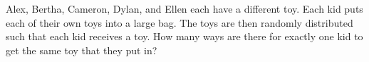 Alex, Bertha, Cameron, Dylan, and Ellen each have a different toy. Each kid puts each of their own toys into a large bag. The toys are then randomly distributed such that each kid receives a toy. How many ways are there for exactly one kid to get the same toy that they put in?